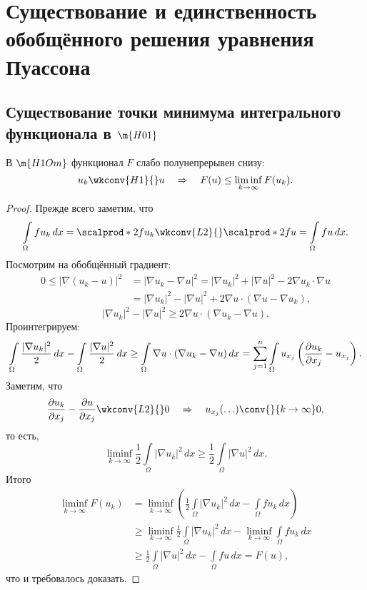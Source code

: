\section{Существование и единственность обобщённого решения уравнения Пуассона}

\subsection{Существование точки минимума интегрального функционала в $\m{H01}$}
\begin{lemma} В $\m{H1Om}$ функционал $F$ слабо полунепрерывен снизу:
$$u_k \wkconv{H1}{} u \quad \Rightarrow \quad F(u) \leq \liminf_{k \to \infty} F(u_k).$$
\end{lemma}
\begin{proof} Прежде всего заметим, что
$$ \int \limits_\Omega f u_k \, dx = \scalprod*{2}{f}{u_k} \wkconv{L2}{} \scalprod*{2}{f}{u} =\int \limits_\Omega f u \, dx.$$
Посмотрим на обобщённый градиент:
\begin{align*}
0 \leq | \nabla (u_k - u) |^2 &= | \nabla u_k - \nabla u |^2 = |\nabla u_k|^2 + |\nabla u|^2 - 2 \nabla u_k \cdot \nabla u \\
&= |\nabla u_k|^2 - |\nabla u|^2 + 2 \nabla u \cdot (\nabla u - \nabla u_k),
\end{align*}
$$ |\nabla u_k|^2 - |\nabla u|^2 \geq 2 \nabla u \cdot (\nabla u_k - \nabla u).$$
Проинтегрируем:
$$ \int \limits_\Omega \frac {| \nabla u_k|^2} {2} \, dx - \int \limits_\Omega \frac {| \nabla u|^2} {2} \, dx \geq \int \limits_\Omega \nabla u \cdot (\nabla u_k - \nabla u) \, dx = \sum_{j=1}^n \int \limits_\Omega u_{x_j} \left( \pder[u_k]{x_j} - u_{x_j} \right) .$$
Заметим, что
$$ \pder[u_k]{x_j} - \pder[u]{x_j} \wkconv{L2}{} 0 \quad \Rightarrow \quad u_{x_j} (\hdots) \conv{}{k \to \infty} 0,$$
то есть,
$$ \liminf_{k \to \infty} \frac {1} {2} \int \limits_\Omega |\nabla u_k|^2 \, dx \geq \frac {1} {2} \int \limits_\Omega |\nabla u|^2 \, dx.$$
Итого
\begin{align*}
\liminf_{k \to \infty} F(u_k) &= \liminf_{k \to \infty}\left( \frac {1}{2} \int \limits_\Omega |\nabla u_k|^2 \, dx - \int \limits_\Omega fu_k \, dx \right) \\
&\geq \liminf_{k \to \infty} \frac {1} {2} \int \limits_\Omega |\nabla u_k|^2 \, dx - \liminf_{k \to \infty} \int \limits_\Omega fu_k \, dx \\
&\geq \frac {1} {2} \int \limits_\Omega |\nabla u|^2 \, dx - \int \limits_\Omega fu \, dx = F(u),
\end{align*}
что и требовалось доказать.

\end{proof}

